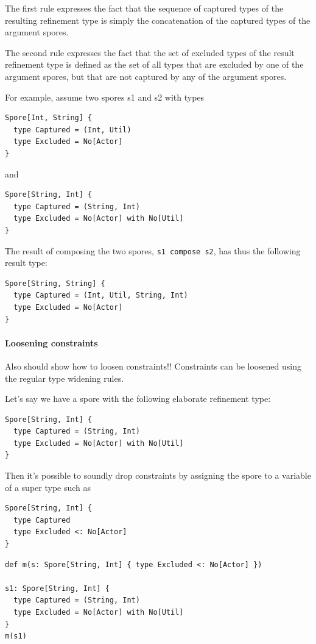 \documentclass{llncs}
\begin{document}
The first rule expresses the fact that the sequence of captured types of the resulting refinement type is simply the concatenation of the captured types of the argument spores.

The second rule expresses the fact that the set of excluded types of the result refinement type is defined as the set of all types that are excluded by one of the argument spores, but that are not captured by any of the argument spores.

For example, assume two spores s1 and s2 with types
\begin{lstlisting}
Spore[Int, String] {
  type Captured = (Int, Util)
  type Excluded = No[Actor]
}
\end{lstlisting}
\noindent
and
\begin{lstlisting}
Spore[String, Int] {
  type Captured = (String, Int)
  type Excluded = No[Actor] with No[Util]
}
\end{lstlisting}
\noindent
The result of composing the two spores, \verb|s1 compose s2|, has thus the following result type:

\begin{lstlisting}
Spore[String, String] {
  type Captured = (Int, Util, String, Int)
  type Excluded = No[Actor]
}
\end{lstlisting}

\paragraph{Loosening constraints}
Also should show how to loosen constraints!!
Constraints can be loosened using the regular type widening rules.

Let's say we have a spore with the following elaborate refinement type:
\begin{lstlisting}
Spore[String, Int] {
  type Captured = (String, Int)
  type Excluded = No[Actor] with No[Util]
}
\end{lstlisting}

Then it's possible to soundly drop constraints by assigning the spore to a variable of a super type such as

\begin{lstlisting}
Spore[String, Int] {
  type Captured
  type Excluded <: No[Actor]
}
\end{lstlisting}

\begin{lstlisting}
def m(s: Spore[String, Int] { type Excluded <: No[Actor] })

s1: Spore[String, Int] {
  type Captured = (String, Int)
  type Excluded = No[Actor] with No[Util]
}
m(s1)
\end{lstlisting}
\end{document}

